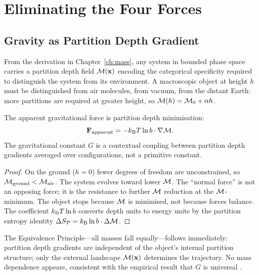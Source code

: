 \section{Eliminating the Four Forces}
\label{sec:ch21-elimination}

\subsection{Gravity as Partition Depth Gradient}

From the derivation in Chapter~\ref{ch:mass}, any system in bounded phase space
carries a partition depth field $\mathcal{M}(\mathbf{x})$ encoding the categorical
specificity required to distinguish the system from its environment.  A
macroscopic object at height $h$ must be distinguished from air molecules,
from vacuum, from the distant Earth: more partitions are required at greater
height, so $\mathcal{M}(h) = \mathcal{M}_0 + \alpha h$.

\begin{theorem}
\label{thm:ch21-gravity}
  The apparent gravitational force is partition depth minimisation:
  \begin{equation}
    \mathbf{F}_{\mathrm{apparent}} = -k_{\mathrm{B}} T \ln b \cdot \nabla\mathcal{M}.
  \end{equation}
  The gravitational constant $G$ is a contextual coupling between partition
  depth gradients averaged over configurations, not a primitive constant.
\end{theorem}

\begin{proof}
  On the ground ($h=0$) fewer degrees of freedom are unconstrained, so
  $\mathcal{M}_{\mathrm{ground}} < \mathcal{M}_{\mathrm{air}}$.  The system evolves toward
  lower $\mathcal{M}$.  The ``normal force'' is not an opposing force; it is the
  resistance to further $\mathcal{M}$ reduction at the $\mathcal{M}$-minimum.  The object
  stops because $\mathcal{M}$ is minimised, not because forces balance.  The
  coefficient $k_{\mathrm{B}} T\ln b$ converts depth units to energy units by the
  partition entropy identity $\Delta S_{\mathcal{P}} = k_{\mathrm{B}} \ln b \cdot
  \Delta\mathcal{M}$.
\end{proof}

\begin{remark}
  The Equivalence Principle---all masses fall equally---follows immediately:
  partition depth gradients are independent of the object's internal partition
  structure; only the external landscape $\mathcal{M}(\mathbf{x})$ determines the
  trajectory.  No mass dependence appears, consistent with the empirical
  result that $G$ is universal \citep{eotvos1922}.
\end{remark}

